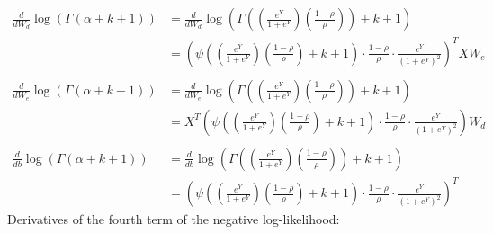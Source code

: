 \documentclass[12pt,a4paper]{article}
\begin{document}
\begin{align*}
\frac{d}{d W_{d}} \log(\Gamma(\alpha + k + 1)) &= \frac{d}{d W_{d}} \log\left(\Gamma\left(\left(\frac{e^{Y}}{1+e^{Y}}\right)\left(\frac{1-\rho}{\rho}\right)\right) + k + 1 \right)\\
&= \left(\psi\left(\left(\frac{e^{Y}}{1+e^{Y}}\right)\left(\frac{1-\rho}{\rho}\right)  + k + 1 \right) \cdot \frac{1-\rho}{\rho} \cdot \frac{e^{Y}}{\left(1+e^{Y}\right)^2} \right)^T XW_e \\
\ \\
\frac{d}{d W_{e}} \log(\Gamma(\alpha + k + 1)) &= \frac{d}{d W_{e}} \log\left(\Gamma\left(\left(\frac{e^{Y}}{1+e^{Y}}\right)\left(\frac{1-\rho}{\rho}\right)\right) + k + 1 \right)\\ 
&= X^T \left(\psi\left(\left(\frac{e^{Y}}{1+e^{Y}}\right)\left(\frac{1-\rho}{\rho}\right)  + k + 1 \right) \cdot \frac{1-\rho}{\rho} \cdot \frac{e^{Y}}{\left(1+e^{Y}\right)^2} \right) W_d \\
\ \\
\frac{d}{d b} \log(\Gamma(\alpha + k + 1)) &= \frac{d}{d b} \log\left(\Gamma\left(\left(\frac{e^{Y}}{1+e^{Y}}\right)\left(\frac{1-\rho}{\rho}\right)\right) + k + 1 \right)\\
&= \left(\psi\left(\left(\frac{e^{Y}}{1+e^{Y}}\right)\left(\frac{1-\rho}{\rho}\right) + k + 1 \right) \cdot \frac{1-\rho}{\rho} \cdot \frac{e^{Y}}{\left(1+e^{Y}\right)^2} \right)^T
\end{align*}
Derivatives of the fourth term of the negative log-likelihood:
\end{document}
